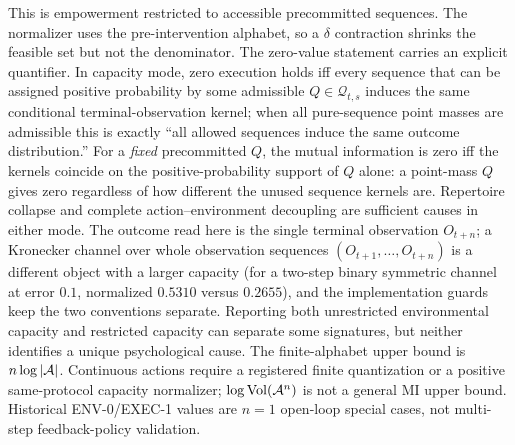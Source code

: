 This is empowerment \citep{klyubin2005,salge2013} restricted to accessible
precommitted sequences. The normalizer uses the pre-intervention alphabet, so
a $\delta$ contraction shrinks the feasible set but not the denominator. The
zero-value statement carries an explicit quantifier. In capacity mode, zero
execution holds iff every sequence that can be assigned positive probability
by some admissible $Q\in\mathcal Q_{t,s}$ induces the same conditional
terminal-observation kernel; when all pure-sequence point masses are
admissible this is exactly ``all allowed sequences induce the same outcome
distribution.'' For a \emph{fixed} precommitted $Q$, the mutual information is
zero iff the kernels coincide on the positive-probability support of $Q$
alone: a point-mass $Q$ gives zero regardless of how different the unused
sequence kernels are. Repertoire collapse and complete action--environment
decoupling are sufficient causes in either mode. The outcome read here is the
single terminal observation $O_{t+n}$; a Kronecker channel over whole
observation sequences $(O_{t+1},\dots,O_{t+n})$ is a different object with a
larger capacity (for a two-step binary symmetric channel at error $0.1$,
normalized $0.5310$ versus $0.2655$), and the implementation guards keep the
two conventions separate. Reporting both unrestricted environmental capacity
and restricted capacity can separate some signatures, but neither identifies a
unique psychological cause. The finite-alphabet upper bound is
$n\log|\mathcal{A}|$. Continuous actions require a registered finite quantization or
a positive same-protocol capacity normalizer; $\log\mathrm{Vol}(\mathcal{A}^n)$ is
not a general MI upper bound. Historical ENV-0/EXEC-1 values are $n=1$
open-loop special cases, not multi-step feedback-policy validation.

